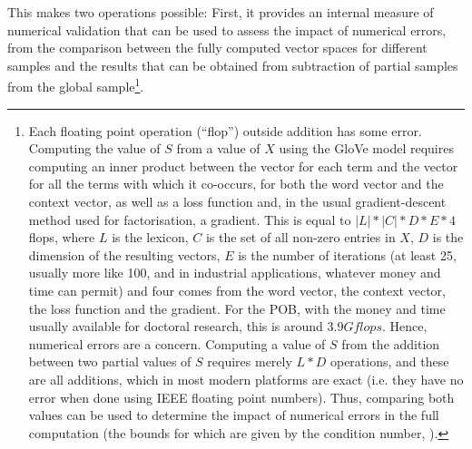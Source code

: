This makes two operations possible:
First, it provides an internal measure of numerical validation that can be used to assess the impact of numerical errors, from the comparison between the fully computed vector spaces for different samples and the results that can be obtained from subtraction of partial samples from the global sample\footnote{
    Each floating point operation (``flop'') outside addition has some error.
    Computing the value of $S$ from a value of $X$ using the GloVe model requires computing an inner product between the vector for each term and the vector for all the terms with which it co-occurs, for both the word vector and the context vector, as well as a loss function and, in the usual gradient-descent method used for factorisation, a gradient.
    This is equal to $|L|*|C|*D*E*4$ flops, where $L$ is the lexicon, $C$ is the set of all non-zero entries in $X$, $D$ is the dimension of the resulting vectors, $E$ is the number of iterations (at least 25, usually more like 100, and in industrial applications, whatever money and time can permit) and four comes from the word vector, the context vector, the loss function and the gradient.
    For the POB, with the money and time usually available for doctoral research, this is around $3.9Gflops$.
    Hence, numerical errors are a concern.
    Computing a value of $S$ from the addition between two partial values of $S$ requires merely $L*D$ operations, and these are all additions, which in most modern platforms are exact (i.e. they have no error when done using IEEE floating point numbers).
    Thus, comparing both values can be used to determine the impact of numerical errors in the full computation (the bounds for which are given by the condition number, \citep[op. cit.]{golub2012}).
}.

